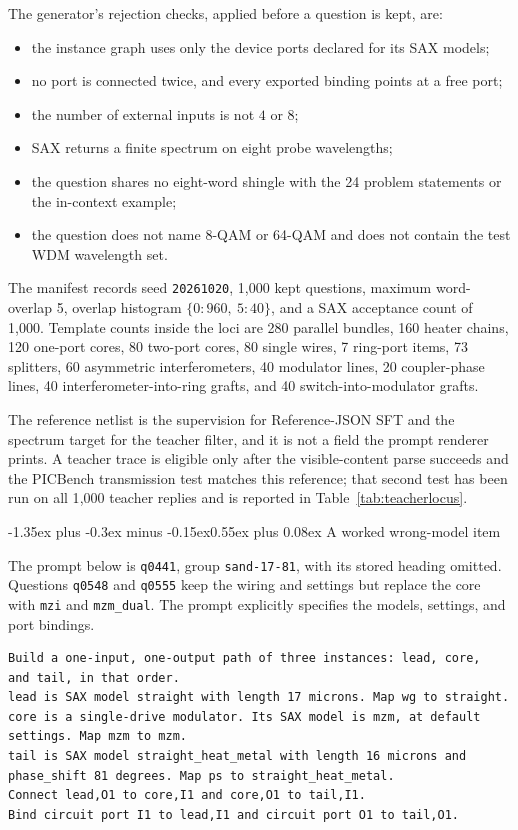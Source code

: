 \documentclass[11pt]{article}
\makeatletter
\renewcommand\section{\@startsection{section}{1}{\z@}%
  {-1.35ex plus -0.3ex minus -0.15ex}{0.55ex plus 0.08ex}%
  {\normalfont\large\bfseries}}
\makeatother
\begin{document}
The generator's rejection checks, applied before a question is kept, are:
\begin{itemize}
\item the instance graph uses only the device ports declared for its SAX models;
\item no port is connected twice, and every exported binding points at a free port;
\item the number of external inputs is not $4$ or $8$;
\item SAX returns a finite spectrum on eight probe wavelengths;
\item the question shares no eight-word shingle with the 24 problem statements or the in-context example;
\item the question does not name 8-QAM or 64-QAM and does not contain the test WDM wavelength set.
\end{itemize}
The manifest records seed \texttt{20261020}, 1{,}000 kept questions, maximum word-overlap 5, overlap histogram $\{0: 960,\ 5: 40\}$, and a SAX acceptance count of 1{,}000.
Template counts inside the loci are 280 parallel bundles, 160 heater chains, 120 one-port cores, 80 two-port cores, 80 single wires, 7 ring-port items, 73 splitters, 60 asymmetric interferometers, 40 modulator lines, 20 coupler-phase lines, 40 interferometer-into-ring grafts, and 40 switch-into-modulator grafts.

The reference netlist is the supervision for Reference-JSON SFT and the spectrum target for the teacher filter, and it is not a field the prompt renderer prints.
A teacher trace is eligible only after the visible-content parse succeeds and the PICBench transmission test matches this reference; that second test has been run on all 1{,}000 teacher replies and is reported in Table~\ref{tab:teacherlocus}.

\section{A worked wrong-model item}
\label{app:example}

The prompt below is \texttt{q0441}, group \texttt{sand-17-81}, with its stored heading omitted. Questions \texttt{q0548} and \texttt{q0555} keep the wiring and settings but replace the core with \texttt{mzi} and \texttt{mzm\_dual}. The prompt explicitly specifies the models, settings, and port bindings.

\begin{verbatim}
Build a one-input, one-output path of three instances: lead, core,
and tail, in that order.
lead is SAX model straight with length 17 microns. Map wg to straight.
core is a single-drive modulator. Its SAX model is mzm, at default
settings. Map mzm to mzm.
tail is SAX model straight_heat_metal with length 16 microns and
phase_shift 81 degrees. Map ps to straight_heat_metal.
Connect lead,O1 to core,I1 and core,O1 to tail,I1.
Bind circuit port I1 to lead,I1 and circuit port O1 to tail,O1.
\end{verbatim}
\end{document}
